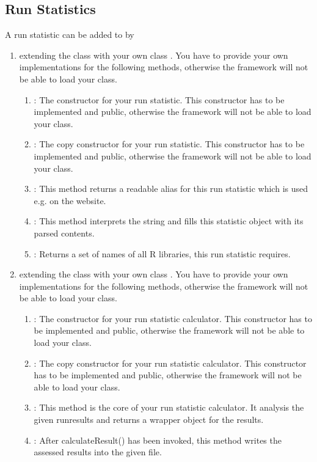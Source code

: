 	\subsection{Run Statistics}\label{subsec_extend_runstats}
	A run statistic  can be added to \clusteval by
	\begin{enumerate}
		\item extending the class  with your own class . You have to provide your own implementations for the following methods, otherwise the framework will not be able to load your class.
		\begin{enumerate}
			\item {}: The constructor for your run statistic. This constructor has to be implemented and public, otherwise the framework will not be able to load your class.
			\item {}: The copy constructor for your run statistic. This constructor has to be implemented and public, otherwise the framework will not be able to load your class.
			\item {}: This method returns a readable alias for this run statistic which is used e.g. on the website.
			\item {}: This method interprets the string and fills this statistic object with its parsed contents.
			\item {}: Returns a set of names of all R libraries, this run statistic requires.
		\end{enumerate}
		\item extending the class  with your own class . You have to provide your own implementations for the following methods, otherwise the framework will not be able to load your class.
		\begin{enumerate}
			\item {}: The constructor for your run statistic calculator. This constructor has to be implemented and public, otherwise the framework will not be able to load your class.
			\item {}: The copy constructor for your run statistic calculator. This constructor has to be implemented and public, otherwise the framework will not be able to load your class.
			\item {}: This method is the core of your run statistic calculator. It analysis the given runresults and returns a wrapper object for the results.
			\item {}: After calculateResult() has been invoked, this method writes the assessed results into the given file.
		\end{enumerate}
		

\end{enumerate}
